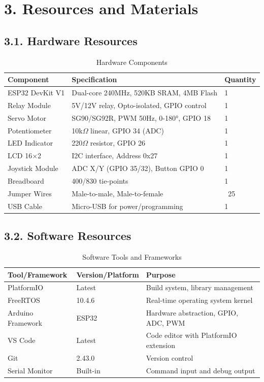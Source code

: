 \documentclass[12pt]{article}
\begin{document}
\section*{3. Resources and Materials}

\subsection*{3.1. Hardware Resources}

\begin{table}[H]
	\centering
	\caption{Hardware Components}
	\label{tab:hardware-resources}
	\begin{tabular}{|l|l|l|}
		\hline
		\textbf{Component} & \textbf{Specification} & \textbf{Quantity} \\
		\hline
		ESP32 DevKit V1 & Dual-core 240MHz, 520KB SRAM, 4MB Flash & 1 \\
		\hline
		Relay Module & 5V/12V relay, Opto-isolated, GPIO control & 1 \\
		\hline
		Servo Motor & SG90/SG92R, PWM 50Hz, 0-180°, GPIO 18 & 1 \\
		\hline
		Potentiometer & 10k$\Omega$ linear, GPIO 34 (ADC) & 1 \\
		\hline
		LED Indicator & 220$\Omega$ resistor, GPIO 26 & 1 \\
		\hline
		LCD 16×2 & I2C interface, Address 0x27 & 1 \\
		\hline
		Joystick Module & ADC X/Y (GPIO 35/32), Button GPIO 0 & 1 \\
		\hline
		Breadboard & 400/830 tie-points & 1 \\
		\hline
		Jumper Wires & Male-to-male, Male-to-female & ~25 \\
		\hline
		USB Cable & Micro-USB for power/programming & 1 \\
		\hline
	\end{tabular}
\end{table}

\subsection*{3.2. Software Resources}

\begin{table}[H]
	\centering
	\caption{Software Tools and Frameworks}
	\label{tab:software-resources}
	\begin{tabular}{|l|l|l|}
		\hline
		\textbf{Tool/Framework} & \textbf{Version/Platform} & \textbf{Purpose} \\
		\hline
		PlatformIO & Latest & Build system, library management \\
		\hline
		FreeRTOS & 10.4.6 & Real-time operating system kernel \\
		\hline
		Arduino Framework & ESP32 & Hardware abstraction, GPIO, ADC, PWM \\
		\hline
		VS Code & Latest & Code editor with PlatformIO extension \\
		\hline
		Git & 2.43.0 & Version control \\
		\hline
		Serial Monitor & Built-in & Command input and debug output \\
		\hline
	\end{tabular}
\end{table}
\end{document}
